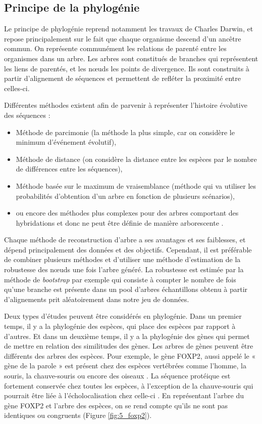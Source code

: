 \subsection{Principe de la phylogénie}\label{principephylo}
\par Le principe de phylogénie reprend notamment les travaux de Charles Darwin, et repose principalement sur le fait que chaque organisme descend d’un ancêtre commun. On représente communément les relations de parenté entre les organismes dans un arbre. Les arbres sont constitués de branches qui représentent les liens de parentés, et les nœuds les points de divergence. Ils sont construits à partir d’alignement de séquences et permettent de refléter la proximité entre celles-ci. 
\par Différentes méthodes existent afin de parvenir à représenter l’histoire évolutive des séquences : 
\begin{itemize}
    \item Méthode de parcimonie (la méthode la plus simple, car on considère le minimum d’événement évolutif), 
    \item Méthode de distance (on considère la distance entre les espèces par le nombre de différences entre les séquences), 
    \item Méthode basée sur le maximum de vraisemblance (méthode qui va utiliser les probabilités d’obtention d’un arbre en fonction de plusieurs scénarios), 
    \item ou encore des méthodes plus complexes pour des arbres comportant des hybridations et donc ne peut être définie de manière arborescente \parencite{tagu_bio-informatique_2010}.
\end{itemize}
\par Chaque méthode de reconstruction d’arbre a ses avantages et ses faiblesses, et dépend principalement des données et des objectifs. Cependant, il est préférable de combiner plusieurs méthodes et d’utiliser une méthode d’estimation de la robustesse des nœuds une fois l’arbre généré. La robustesse est estimée par la méthode de \textit{bootstrap} par exemple qui consiste à compter le nombre de fois qu’une branche est présente dans un pool d’arbres échantillons obtenu à partir d’alignements prit aléatoirement dans notre jeu de données.
\par Deux types d’études peuvent être considérés en phylogénie. Dans un premier temps, il y a la phylogénie des espèces, qui place des espèces par rapport à d’autres. Et dans un deuxième temps, il y a la phylogénie des gènes qui permet de mettre en relation des similitudes des gènes. Les arbres de gènes peuvent être différents des arbres des espèces. Pour exemple, le gène FOXP2, aussi appelé le « gène de la parole » est présent chez des espèces vertébrées comme l’homme, la souris, la chauve-souris ou encore des oiseaux \parencite{enard_molecular_2002, scharff_evolutionary_2005, webb_foxp2_2005, white_singing_2006}. La séquence protéique est fortement conservée chez toutes les espèces, à l’exception de la chauve-souris qui pourrait être liée à l’écholocalisation chez celle-ci \parencite{li_accelerated_2007}. En représentant l’arbre du gène FOXP2 et l’arbre des espèces, on se rend compte qu’ils ne sont pas identiques ou congruents (Figure \ref{fig:5_foxp2}). 
